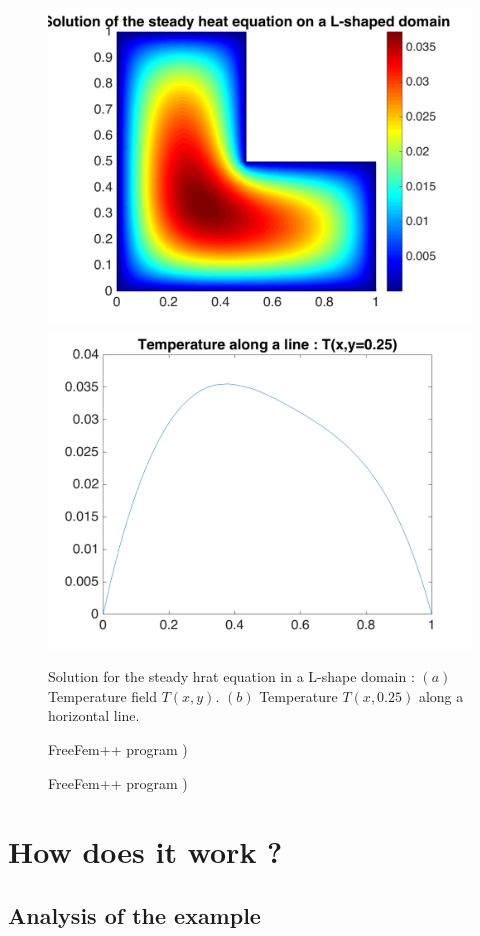\begin{figure}[t]
\includegraphics[width = .45 \linewidth]{../../CASES_STABLE/EXAMPLE_Lshape/FIGURES/Lshape_T0.png}
\includegraphics[width = .45 \linewidth]{../../CASES_STABLE/EXAMPLE_Lshape/FIGURES/Lshape_T0_Cut.png}
\caption{Solution for the steady hrat equation in a L-shape domain : $(a)$ Temperature field $T(x,y)$. 
$(b)$ Temperature $T(x,0.25)$ along a horizontal line. }
\label{Lshape_Figures}
\end{figure}

\begin{figure}[t]
\small

 \normalsize
\caption{
FreeFem++ program )}
\label{Lshape_Mesh.edp}
\end{figure}


\begin{figure}[t]
\small

\normalsize
\caption{
FreeFem++ program )}
\label{Lshape_Mesh.edp}
\end{figure}


\clearpage

\section{How does it work ?}

\subsection{Analysis of the example}

